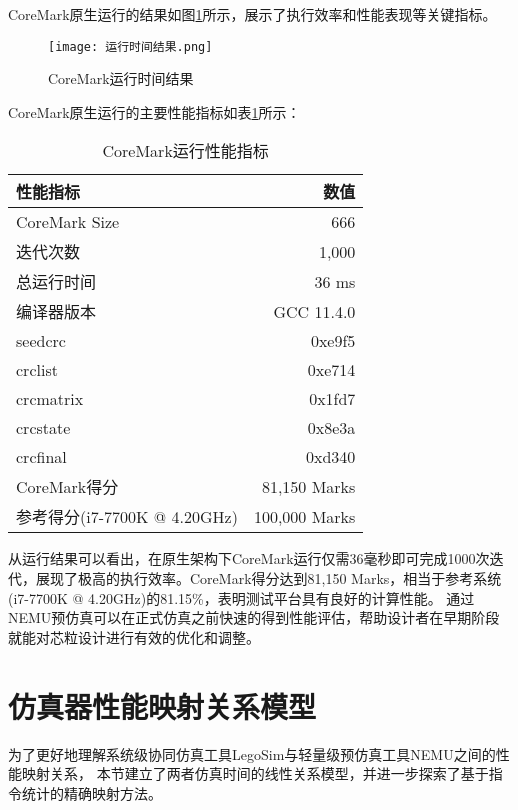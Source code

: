 \documentclass[bachelor]{thesis-uestc}
\begin{document}
    CoreMark原生运行的结果如图\ref{fig:runtime_results}所示，展示了执行效率和性能表现等关键指标。
    
    \begin{figure}[htbp]
        \centering
        \texttt{[image: 运行时间结果.png]}
        \caption{CoreMark运行时间结果}
        \label{fig:runtime_results}
    \end{figure}
    
    CoreMark原生运行的主要性能指标如表\ref{tab:runtime_metrics}所示：
    
    \begin{table}[htbp]
    \caption{CoreMark运行性能指标}
    \centering
    \begin{tabular}{|l|r|}
    \hline
    \textbf{性能指标} & \textbf{数值} \\
    \hline
    CoreMark Size & 666 \\
    \hline
    迭代次数 & 1,000 \\
    \hline
    总运行时间 & 36 ms \\
    \hline
    编译器版本 & GCC 11.4.0 \\
    \hline
    seedcrc & 0xe9f5 \\
    \hline
    crclist & 0xe714 \\
    \hline
    crcmatrix & 0x1fd7 \\
    \hline
    crcstate & 0x8e3a \\
    \hline
    crcfinal & 0xd340 \\
    \hline
    CoreMark得分 & 81,150 Marks \\
    \hline
    参考得分(i7-7700K @ 4.20GHz) & 100,000 Marks \\
    \hline
    \end{tabular}
    \label{tab:runtime_metrics}
    \end{table}
    
    从运行结果可以看出，在原生架构下CoreMark运行仅需36毫秒即可完成1000次迭代，展现了极高的执行效率。CoreMark得分达到81,150 Marks，相当于参考系统(i7-7700K @ 4.20GHz)的81.15\%，表明测试平台具有良好的计算性能。
    通过NEMU预仿真可以在正式仿真之前快速的得到性能评估，帮助设计者在早期阶段就能对芯粒设计进行有效的优化和调整。


    
    \section{仿真器性能映射关系模型}

    为了更好地理解系统级协同仿真工具LegoSim与轻量级预仿真工具NEMU之间的性能映射关系，
    本节建立了两者仿真时间的线性关系模型，并进一步探索了基于指令统计的精确映射方法。
    
\end{document}
